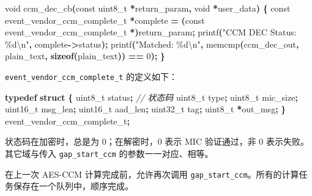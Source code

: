 \documentclass[
  12pt,
]{book}
\newenvironment{Shaded}{\begin{snugshade}}{\end{snugshade}}
\newcommand{\CommentTok}[1]{\textcolor[rgb]{0.56,0.35,0.01}{\textit{#1}}}
\newcommand{\DataTypeTok}[1]{\textcolor[rgb]{0.13,0.29,0.53}{#1}}
\newcommand{\DecValTok}[1]{\textcolor[rgb]{0.00,0.00,0.81}{#1}}
\newcommand{\KeywordTok}[1]{\textcolor[rgb]{0.13,0.29,0.53}{\textbf{#1}}}
\newcommand{\NormalTok}[1]{#1}
\newcommand{\OperatorTok}[1]{\textcolor[rgb]{0.81,0.36,0.00}{\textbf{#1}}}
\newcommand{\SpecialCharTok}[1]{\textcolor[rgb]{0.00,0.00,0.00}{#1}}
\newcommand{\StringTok}[1]{\textcolor[rgb]{0.31,0.60,0.02}{#1}}
\begin{document}
\begin{Shaded}
\begin{Highlighting}[]
\DataTypeTok{void}\NormalTok{ ccm\_dec\_cb}\OperatorTok{(}\DataTypeTok{const} \DataTypeTok{uint8\_t} \OperatorTok{*}\NormalTok{return\_param}\OperatorTok{,} \DataTypeTok{void} \OperatorTok{*}\NormalTok{user\_data}\OperatorTok{)}
\OperatorTok{\{}
  \DataTypeTok{const}\NormalTok{ event\_vendor\_ccm\_complete\_t }\OperatorTok{*}\NormalTok{complete }\OperatorTok{=}
    \OperatorTok{(}\DataTypeTok{const}\NormalTok{ event\_vendor\_ccm\_complete\_t }\OperatorTok{*)}\NormalTok{return\_param}\OperatorTok{;}
\NormalTok{  printf}\OperatorTok{(}\StringTok{"CCM DEC Status: \%d}\SpecialCharTok{\textbackslash{}n}\StringTok{"}\OperatorTok{,}\NormalTok{ complete}\OperatorTok{{-}\textgreater{}}\NormalTok{status}\OperatorTok{);}
\NormalTok{  printf}\OperatorTok{(}\StringTok{"Matched: \%d}\SpecialCharTok{\textbackslash{}n}\StringTok{"}\OperatorTok{,}
\NormalTok{    memcmp}\OperatorTok{(}\NormalTok{ccm\_dec\_out}\OperatorTok{,}\NormalTok{ plain\_text}\OperatorTok{,} \KeywordTok{sizeof}\OperatorTok{(}\NormalTok{plain\_text}\OperatorTok{))} \OperatorTok{==} \DecValTok{0}\OperatorTok{);}
\OperatorTok{\}}
\end{Highlighting}
\end{Shaded}

\texttt{event\_vendor\_ccm\_complete\_t} 的定义如下：

\begin{Shaded}
\begin{Highlighting}[]
\KeywordTok{typedef} \KeywordTok{struct}
\OperatorTok{\{}
    \DataTypeTok{uint8\_t}\NormalTok{  status}\OperatorTok{;}   \CommentTok{// 状态码}
    \DataTypeTok{uint8\_t}\NormalTok{  type}\OperatorTok{;}
    \DataTypeTok{uint8\_t}\NormalTok{  mic\_size}\OperatorTok{;}
    \DataTypeTok{uint16\_t}\NormalTok{ msg\_len}\OperatorTok{;}
    \DataTypeTok{uint16\_t}\NormalTok{ aad\_len}\OperatorTok{;}
    \DataTypeTok{uint32\_t}\NormalTok{ tag}\OperatorTok{;}
    \DataTypeTok{uint8\_t} \OperatorTok{*}\NormalTok{out\_msg}\OperatorTok{;}
\OperatorTok{\}}\NormalTok{ event\_vendor\_ccm\_complete\_t}\OperatorTok{;}
\end{Highlighting}
\end{Shaded}

状态码在加密时，总是为 0；在解密时，0 表示 MIC 验证通过，非 0 表示失败。其它域与传入
\texttt{gap\_start\_ccm} 的参数一一对应、相等。

在上一次 AES-CCM 计算完成前，允许再次调用 \texttt{gap\_start\_ccm}。所有的计算任务保存在一个队列中，顺序完成。
\end{document}
